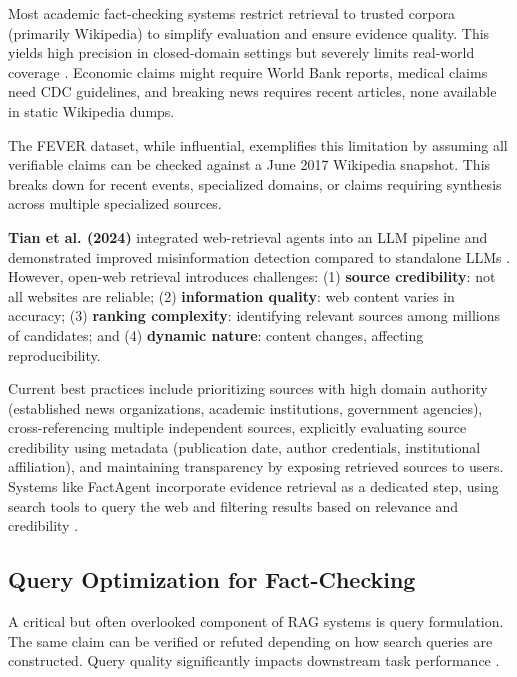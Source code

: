 \documentclass[12pt,a4paper]{article}
\begin{document}
Most academic fact-checking systems restrict retrieval to trusted corpora (primarily Wikipedia) to simplify evaluation and ensure evidence quality. This yields high precision in closed-domain settings but severely limits real-world coverage \citep{gao2023rarr}. Economic claims might require World Bank reports, medical claims need CDC guidelines, and breaking news requires recent articles, none available in static Wikipedia dumps.

The FEVER dataset, while influential, exemplifies this limitation by assuming all verifiable claims can be checked against a June 2017 Wikipedia snapshot. This breaks down for recent events, specialized domains, or claims requiring synthesis across multiple specialized sources.

\textbf{Tian et al. (2024)} integrated web-retrieval agents into an LLM pipeline and demonstrated improved misinformation detection compared to standalone LLMs \citep{tian2024webagents}. However, open-web retrieval introduces challenges: (1) \textbf{source credibility}: not all websites are reliable; (2) \textbf{information quality}: web content varies in accuracy; (3) \textbf{ranking complexity}: identifying relevant sources among millions of candidates; and (4) \textbf{dynamic nature}: content changes, affecting reproducibility.

Current best practices include prioritizing sources with high domain authority (established news organizations, academic institutions, government agencies), cross-referencing multiple independent sources, explicitly evaluating source credibility using metadata (publication date, author credentials, institutional affiliation), and maintaining transparency by exposing retrieved sources to users. Systems like FactAgent incorporate evidence retrieval as a dedicated step, using search tools to query the web and filtering results based on relevance and credibility \citep{hysonlab2025factagent}.

\subsection{Query Optimization for Fact-Checking}

A critical but often overlooked component of RAG systems is query formulation. The same claim can be verified or refuted depending on how search queries are constructed. Query quality significantly impacts downstream task performance \citep{ma2025guided, hassan2021claimbuster}.
\end{document}
